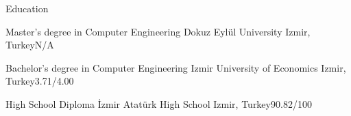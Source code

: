 \begin{Section}{Education}

    {Master's degree in Computer Engineering}
    {Dokuz Eylül University}
    {Izmir, Turkey}{N/A}

    {Bachelor's degree in Computer Engineering}
    {Izmir University of Economics}
    {Izmir, Turkey}{3.71/4.00}

    {High School Diploma}
    {İzmir Atatürk High School}
    {Izmir, Turkey}{90.82/100}

\end{Section}